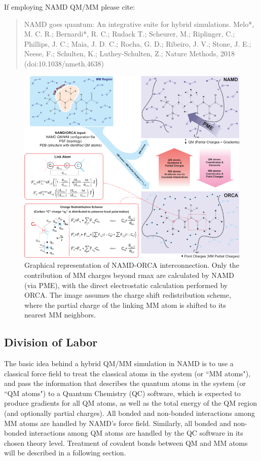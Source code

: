 If employing NAMD QM/MM please cite:
\begin{quote}
NAMD goes quantum: An integrative suite for hybrid simulations.
Melo*, M. C. R.; Bernardi*, R. C.; Rudack T.; Scheurer, M.; Riplinger, C.;
Phillips, J. C.; Maia, J. D. C.; Rocha, G. D.; Ribeiro, J. V.;
Stone, J. E.; Neese, F.; Schulten, K.; Luthey-Schulten, Z.;
Nature Methods, 2018 (doi:10.1038/nmeth.4638)
\end{quote}

\begin{figure}[tbp]
\centering
\includegraphics[width=6in]{figures/hybrid_qmmm_diagram.png}
\caption[Hybrid QM/MM NAMD]{%
Graphical representation of NAMD-ORCA interconnection.
Only the contribution of MM charges beyond rmax are
calculated by NAMD (via PME), with the direct electrostatic
calculation performed by ORCA.
The image assumes the charge shift redistribution scheme,
where the partial charge of the linking MM atom is shifted
to its nearest MM neighbors.
}
\label{fig:hybrid_qmmm}
\end{figure}


\subsection{Division of Labor}

The basic idea behind a hybrid QM/MM simulation in NAMD is to use 
a classical force field to treat the classical atoms in the system 
(or ``MM atoms"), and pass the information that describes the quantum 
atoms in the system (or ``QM atoms") to a Quantum Chemistry (QC) software, 
which is expected to produce gradients for all QM atoms, as well as 
the total energy of the QM region (and optionally partial charges). 
All bonded and non-bonded interactions among MM atoms are handled 
by NAMD's force field. Similarly, all bonded and non-bonded interactions 
among QM atoms are handled by the QC software in its chosen theory level. 
Treatment of covalent bonds between QM and MM atoms will be described 
in a following section.

